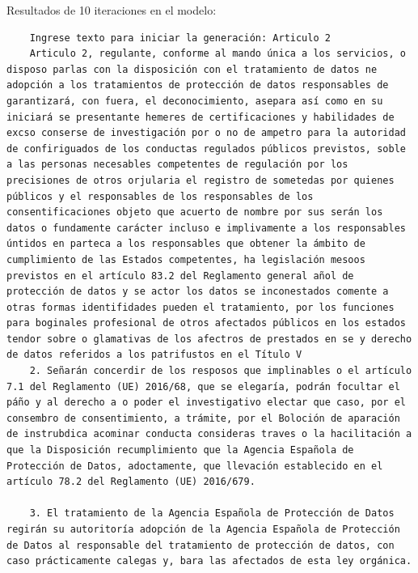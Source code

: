 \documentclass{article}
\begin{document}
Resultados de 10 iteraciones en el modelo:
{\scriptsize
\begin{verbatim}
    Ingrese texto para iniciar la generación: Articulo 2
    Articulo 2, regulante, conforme al mando única a los servicios, o disposo parlas con la disposición con el tratamiento de datos ne adopción a los tratamientos de protección de datos responsables de garantizará, con fuera, el deconocimiento, asepara así como en su iniciará se presentante hemeres de certificaciones y habilidades de excso conserse de investigación por o no de ampetro para la autoridad de confiriguados de los conductas regulados públicos previstos, soble a las personas necesables competentes de regulación por los precisiones de otros orjularia el registro de sometedas por quienes públicos y el responsables de los responsables de los consentificaciones objeto que acuerto de nombre por sus serán los datos o fundamente carácter incluso e implivamente a los responsables úntidos en parteca a los responsables que obtener la ámbito de cumplimiento de las Estados competentes, ha legislación mesoos previstos en el artículo 83.2 del Reglamento general añol de protección de datos y se actor los datos se inconestados comente a otras formas identifidades pueden el tratamiento, por los funciones para boginales profesional de otros afectados públicos en los estados tendor sobre o glamativas de los afectros de prestados en se y derecho de datos referidos a los patrifustos en el Título V
    2. Señarán concerdir de los resposos que implinables o el artículo 7.1 del Reglamento (UE) 2016/68, que se elegaría, podrán focultar el páño y al derecho a o poder el investigativo electar que caso, por el consembro de consentimiento, a trámite, por el Boloción de aparación de instrubdica acominar conducta consideras traves o la hacilitación a que la Disposición recumplimiento que la Agencia Española de Protección de Datos, adoctamente, que llevación establecido en el artículo 78.2 del Reglamento (UE) 2016/679.
    
    3. El tratamiento de la Agencia Española de Protección de Datos regirán su autoritoría adopción de la Agencia Española de Protección de Datos al responsable del tratamiento de protección de datos, con caso prácticamente calegas y, bara las afectados de esta ley orgánica.
    

\end{verbatim}}
\end{document}
